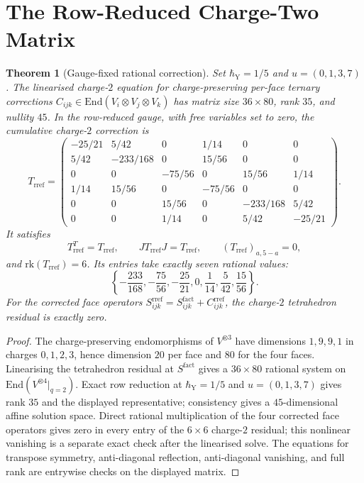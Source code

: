 \documentclass[11pt]{amsart}
\newtheorem{theorem}{Theorem}[section]
\theoremstyle{definition}
\theoremstyle{remark}
\newcommand{\End}{\mathrm{End}}
\newcommand{\rk}{\mathrm{rk}}
\begin{document}
\section{The Row-Reduced Charge-Two Matrix}

\begin{theorem}[Gauge-fixed rational correction]
\label{thm:rref-zte-correction}
Set $\hbar_{\mathrm{Y}}=1/5$ and $u=(0,1,3,7)$.  The linearised
charge-$2$ equation for charge-preserving per-face ternary corrections
$C_{ijk}\in\End(V_i\otimes V_j\otimes V_k)$ has matrix size
$36\times 80$, rank $35$, and nullity $45$.  In the row-reduced gauge,
with free variables set to zero, the cumulative charge-$2$ correction is
\[
T_{\operatorname{rref}}=
\begin{pmatrix}
-25/21 & 5/42 & 0 & 1/14 & 0 & 0\\
5/42 & -233/168 & 0 & 15/56 & 0 & 0\\
0 & 0 & -75/56 & 0 & 15/56 & 1/14\\
1/14 & 15/56 & 0 & -75/56 & 0 & 0\\
0 & 0 & 15/56 & 0 & -233/168 & 5/42\\
0 & 0 & 1/14 & 0 & 5/42 & -25/21
\end{pmatrix}.
\]
It satisfies
\[
  T_{\operatorname{rref}}^T=T_{\operatorname{rref}},
  \qquad
  JT_{\operatorname{rref}}J=T_{\operatorname{rref}},
  \qquad
  (T_{\operatorname{rref}})_{a,5-a}=0,
\]
and $\rk(T_{\operatorname{rref}})=6$.  Its entries take exactly seven
rational values:
\[
  \left\{
  -\frac{233}{168},-\frac{75}{56},-\frac{25}{21},
  0,\frac{1}{14},\frac{5}{42},\frac{15}{56}
  \right\}.
\]
For the corrected face operators
$S^{\mathrm{rref}}_{ijk}=S^{\mathrm{fact}}_{ijk}+C^{\mathrm{rref}}_{ijk}$,
the charge-$2$ tetrahedron residual is exactly zero.
\end{theorem}

\begin{proof}
The charge-preserving endomorphisms of $V^{\otimes 3}$ have dimensions
$1,9,9,1$ in charges $0,1,2,3$, hence dimension $20$ per face and
$80$ for the four faces.  Linearising the tetrahedron residual at
$S^{\mathrm{fact}}$ gives a $36\times 80$ rational system on
$\End(V^{\otimes 4}|_{q=2})$.  Exact row reduction at
$\hbar_{\mathrm{Y}}=1/5$ and $u=(0,1,3,7)$ gives rank $35$ and the
displayed representative; consistency gives a $45$-dimensional affine
solution space.  Direct rational multiplication of the four corrected
face operators gives zero in every entry of the $6\times 6$ charge-$2$
residual; this nonlinear vanishing is a separate exact check after the
linearised solve.  The equations for transpose symmetry, anti-diagonal
reflection, anti-diagonal vanishing, and full rank are entrywise checks
on the displayed matrix.
\end{proof}
\end{document}
